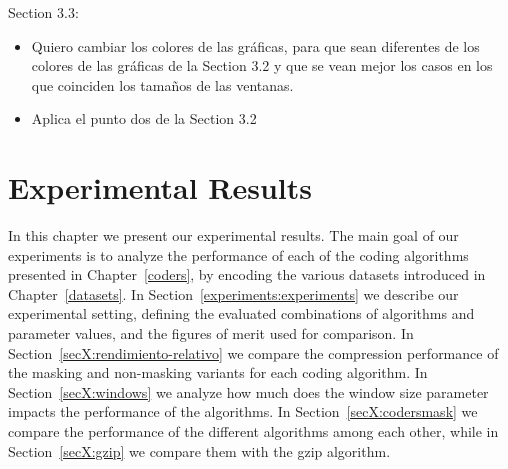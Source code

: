 Section 3.3:
\vspace{-10pt}
\begin{itemize}
\item Quiero cambiar los colores de las gráficas, para que sean diferentes de los colores de las gráficas de la Section 3.2 y que se vean mejor los casos en los que coinciden los tamaños de las ventanas.
\item Aplica el punto dos de la Section 3.2
\end{itemize}


\chapter{Experimental Results} %

\label{experiments} %


\newcommand{\maskalgo}{\textit{M}}
\newcommand{\NOmaskalgo}{\textit{NM}}
\newcommand{\coder}{\textit{c}}
\newcommand{\difrelativa}{\textit{RD}}
\newcommand{\tasacompresion}{\textit{CR}}
\newcommand{\nmbits}{\NOmaskalgo_{\textit{S}}}
\newcommand{\mbits}{\maskalgo_\textit{S}}
\newcommand{\cmaskalgo}{$c_\maskalgo$}
\newcommand{\cNOmaskalgo}{$c_\NOmaskalgo$}
\newcommand{\ca}{\textit{CI}}
\newcommand{\algo}{\textit{c}}




In this chapter we present our experimental results. The main goal of our experiments is to analyze the performance of each of the coding algorithms presented in Chapter~\ref{coders}, by encoding the various datasets introduced in Chapter~\ref{datasets}. In Section~\ref{experiments:experiments} we describe our experimental setting, defining the evaluated combinations of algorithms and parameter values, and the figures of merit used for comparison. In Section~\ref{secX:rendimiento-relativo} we compare the compression performance of the masking and non-masking variants for each coding algorithm. In Section~\ref{secX:windows} we analyze how much does the window size parameter impacts the performance of the algorithms. In Section~\ref{secX:codersmask} we compare the performance of the different algorithms among each other, while in Section~\ref{secX:gzip} we compare them with the gzip algorithm.




